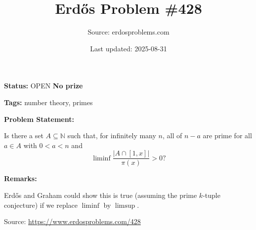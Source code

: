 \documentclass{article}
\title{Erd\H{o}s Problem \#428}
\date{Last updated: 2025-08-31}
\author{Source: erdosproblems.com}
\begin{document}
\maketitle

\noindent\textbf{Status:} OPEN \quad \textbf{No prize}

\noindent\textbf{Tags:} number theory, primes

\medskip
\noindent\textbf{Problem Statement:}

Is there a set $A\subseteq \mathbb{N}$ such that, for infinitely many $n$, all of $n-a$ are prime for all $a\in A$ with $0<a<n$ and\[\liminf\frac{\lvert A\cap [1,x]\rvert}{\pi(x)}>0?\]

\bigskip
\noindent\textbf{Remarks:}

Erd\H{o}s and Graham could show this is true (assuming the prime $k$-tuple conjecture) if we replace $\liminf$ by $\limsup$.

\bigskip
\noindent\small{Source: \url{https://www.erdosproblems.com/428}}
\end{document}
